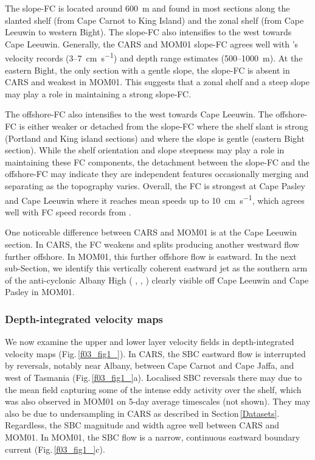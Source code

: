 \documentclass[preprint,3p,review,12pt]{elsarticle}
\newcommand{\citepos}[1]{\citeauthor{#1}'s \citeyearpar{#1}}
\begin{document}
The slope-FC is located around \SI{600}{\meter} and found in most sections along the slanted shelf (from Cape Carnot to King Island) and the zonal shelf (from Cape Leeuwin to western Bight). The slope-FC also intensifies to the west towards Cape Leeuwin. Generally, the CARS and MOM01 slope-FC agrees well with \citepos{Middleton2007} velocity records (\num{3}--\SI{7}{\centi\meter\per\second}) and depth range estimates (\num{500}--\SI{1000}{\meter}). At the eastern Bight, the only section with a gentle slope, the slope-FC is absent in CARS and weakest in MOM01. This suggests that a zonal shelf and a steep slope may play a role in maintaining a strong slope-FC. 

The offshore-FC also intensifies to the west towards Cape Leeuwin. The offshore-FC is either weaker or detached from the slope-FC where the shelf slant is strong (Portland and King island sections) and where the slope is gentle (eastern Bight section). While the shelf orientation and slope steepness may play a role in maintaining these FC components, the detachment between the slope-FC and the offshore-FC may indicate they are independent features occasionally merging and separating as the topography varies. Overall, the FC is strongest at Cape Pasley and Cape Leeuwin where it reaches mean speeds up to \SI{10}{\centi\meter\per\second}, which agrees well with FC speed records from \citet{Cresswell1993}.

One noticeable difference between CARS and MOM01 is at the Cape Leeuwin section. In CARS, the FC weakens and splits producing another westward flow further offshore. In MOM01, this further offshore flow is eastward. 
In the next sub-Section, we identify this vertically coherent eastward jet as the southern arm of the anti-cyclonic Albany High (\citeauthor{Middleton2003} \citeyear{Middleton2003}, \citeauthor{Middleton2007} \citeyear{Middleton2007}, \citeauthor{McCartney2007} \citeyear{McCartney2007}) clearly visible off Cape Leeuwin and Cape Pasley in MOM01.

\subsubsection{Depth-integrated velocity maps}\label{Depth-integrated velocity maps}
We now examine the upper and lower layer velocity fields in depth-integrated velocity maps (Fig.\,\ref{f03_fig1_}). In CARS, the SBC eastward flow is interrupted by reversals, notably near Albany, between Cape Carnot and Cape Jaffa, and west of Tasmania (Fig.\,\ref{f03_fig1_}a). Localised SBC reversals there may due to the mean field capturing some of the intense eddy activity over the shelf, which was also observed in MOM01 on 5-day average timescales (not shown). They may also be due to undersampling in CARS as described in Section\,\ref{Datasets}. Regardless, the SBC magnitude and width agree well between CARS and MOM01. In MOM01, the SBC flow is a narrow, continuous eastward boundary current (Fig.\,\ref{f03_fig1_}c).
\end{document}
